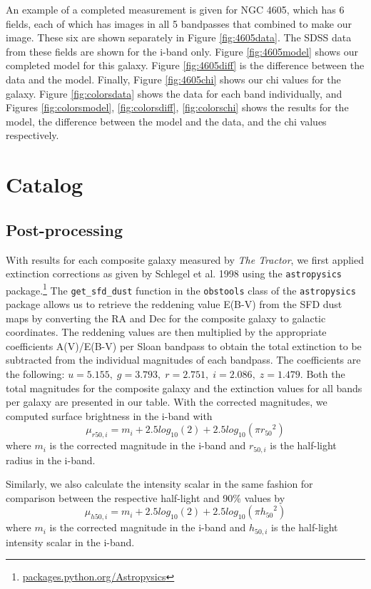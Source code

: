 \documentclass[12pt,preprint,pdftex]{aastex}
\begin{document}
An example of a completed measurement is given for NGC 4605, which has
6 fields, each of which has images in all 5 bandpasses that combined
to make our image. These six are shown separately in Figure
\ref{fig:4605data}. The SDSS data from these fields are shown for the
i-band only. Figure \ref{fig:4605model} shows our completed model for
this galaxy. Figure \ref{fig:4605diff} is the difference between the
data and the model. Finally, Figure \ref{fig:4605chi} shows our chi
values for the galaxy. Figure \ref{fig:colorsdata} shows the data for
each band individually, and Figures \ref{fig:colorsmodel},
\ref{fig:colorsdiff}, \ref{fig:colorschi} shows the results for the
model, the difference between the model and the data, and the chi
values respectively.

\section{Catalog}
\subsection{Post-processing}
With results for each composite galaxy measured by \emph{The Tractor}, we
first applied extinction corrections as given by Schlegel et al. 1998
using the \verb|astropysics|
package.\footnote{\url{packages.python.org/Astropysics}} The
\verb|get_sfd_dust| function in the \verb|obstools| class of the
\verb|astropysics| package allows us to retrieve the reddening value
E(B-V) from the SFD dust maps by converting the RA and Dec for the
composite galaxy to galactic coordinates. The reddening values are
then multiplied by the appropriate coefficients A(V)/E(B-V) per Sloan
bandpass to obtain the total extinction to be subtracted from the
individual magnitudes of each bandpass. The coefficients are the
following: $u=5.155,\;g=3.793,\; r=2.751,\; i=2.086,\; z=1.479$. Both
the total magnitudes for the composite galaxy and the extinction
values for all bands per galaxy are presented in our table. With the
corrected magnitudes, we computed surface brightness in the i-band
with \begin{equation}
  \mu_{r50,i}=m_i+2.5log_{10}(2)+2.5log_{10}(\pi{r_{50}}^2) \end{equation} where $m_i$ is
the corrected magnitude in the i-band and $r_{50,i}$ is the half-light
radius in the i-band.

Similarly, we also calculate the intensity scalar in the same fashion
for comparison between the respective half-light and 90\%
values by\begin{equation}
  \mu_{h50,i}=m_i+2.5log_{10}(2)+2.5log_{10}(\pi{h_{50}}^2) \end{equation}
where $m_i$ is the corrected magnitude in the i-band and $h_{50,i}$ is
the half-light intensity scalar in the i-band.
\end{document}
